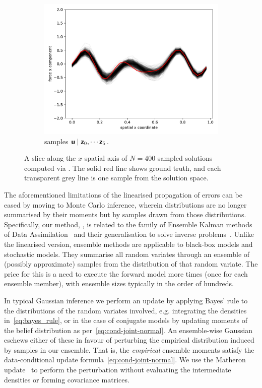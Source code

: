 \begin{figure}[h!t]
\begin{subfigure}{0.3\textwidth}
        \includegraphics[scale=0.35]{meth_ex_guess_4.pdf}
         \caption{\meth{} samples \(\boldsymbol{\mathsf{u}}\mid \boldsymbol{\mathsf{z}}_0,\cdots\boldsymbol{\mathsf{z}}_5\).}
         \label{fig:meth_ex_4}
     \end{subfigure}
     \hfill
    \centering
    \caption{A slice along the \(x\) spatial  axis of  \(N=400\) sampled solutions computed via \meth{}. The solid red line shows ground truth, and each transparent grey line is one sample from the solution space.}
    \label{fig:inverse-slices}
\end{figure}


The aforementioned limitations of the linearised propagation of errors can be eased by moving to Monte Carlo inference, wherein distributions are no longer summarised by their moments but  by samples drawn from those distributions.
Specifically, our method, \meth, is related to the family of Ensemble Kalman methods of Data Assimilation~\cite{EvensenData2009} and their generalisation to solve inverse problems~\cite{IglesiasEnsemble2013}.
Unlike the linearised version, ensemble methods are applicable to black-box models and stochastic models.  They summarise all random variates through an ensemble of (possibly approximate) samples from the distribution of that random variate.
The price for this is a need to execute the forward model more times (once for each ensemble member), with ensemble sizes typically in the order of hundreds.

In typical Gaussian inference we perform  an update by applying Bayes' rule to the distributions of the random variates involved, e.g. integrating the densities in~\eqref{eq:bayes_rule}, or in the case of conjugate models by updating moments of the belief distribution as per~\eqref{eq:cond-joint-normal}.
An ensemble-wise Gaussian eschews either of these in favour of perturbing the empirical distribution induced by samples in our ensemble.
That is, the \emph{empirical} ensemble moments satisfy the data-conditional update formula~\eqref{eq:cond-joint-normal}.
We use the Matheron update~\citep{WilsonPathwise2021} to perform the perturbation without evaluating the intermediate densities or forming covariance matrices.

